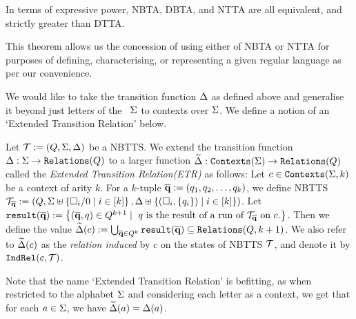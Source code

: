 \begin{theorem}
    In terms of expressive power, NBTA, DBTA, and NTTA are all equivalent, and strictly greater than DTTA.
\end{theorem}


This theorem allows us the concession of using either of NBTA or NTTA for purposes of defining, characterising, or representing a given regular language as per our convenience.

We would like to take the transition function $\Delta$ as defined above and generalise it beyond just letters of the \rab\ $\Sigma$ to contexts over $\Sigma$. We define a notion of an `Extended Transition Relation' below.

\begin{definition}\label{def:extendedTransitionRelation}
    Let $\mathcal{T} := (Q, \Sigma, \Delta)$ be a NBTTS. We extend the transition function $\Delta : \Sigma \to \texttt{Relations}(Q)$ to a larger function $\widetilde{\Delta} : \texttt{Contexts}(\Sigma) \to \texttt{Relations}(Q)$ called the \emph{Extended Transition Relation(ETR)} as follows: Let $c \in \texttt{Contexts}(\Sigma, k)$ be a context of arity $k$. For a $k$-tuple $\overline{\textbf{q}} := (q_1, q_2, \dots, q_k)$, we define NBTTS $\mathcal{T}_{\overline{\textbf{q}}} := (Q, \Sigma \uplus \left\{ \square_i/0 \mid i \in [k] \right\}, \Delta \uplus \left\{ (\square_i, \left\{ q_i \right\}) \mid i \in [k] \right\})$. Let $\texttt{result}(\overline{\textbf{q}}) := \left\{ (\overline{\textbf{q}}, q) \in Q^{k+1} \mid \mbox{ $q$ is the result of a run of $\mathcal{T}_{\overline{\textbf{q}}}$ on $c$.} \right\}$. Then we define the value $\widetilde{\Delta}(c) := \bigcup_{\overline{\textbf{q}} \in Q^k} \texttt{result}(\overline{\textbf{q}}) \subseteq \texttt{Relations}(Q, k+1)$. We also refer to $\widetilde{\Delta}(c)$ as the \emph{relation induced} by $c$ on the states of NBTTS $\mathcal{T}$, and denote it by $\texttt{IndRel}(c, \mathcal{T})$.
\end{definition}

Note that the name `Extended Transition Relation' is befitting, as when restricted to the alphabet $\Sigma$ and considering each letter as a context, we get that for each $a \in \Sigma$, we have $\widetilde{\Delta}(a) = \Delta(a)$.

